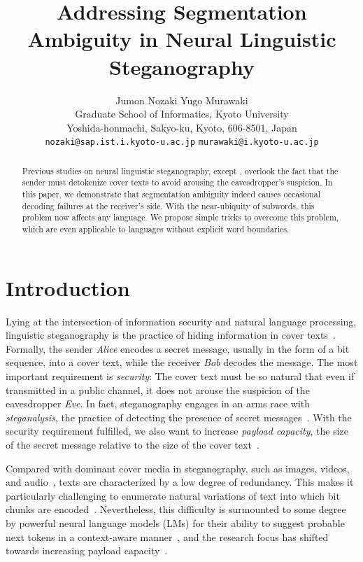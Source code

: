 \documentclass[11pt]{article}
\title{Addressing Segmentation Ambiguity in Neural Linguistic Steganography}
\author{Jumon Nozaki
  \hspace{25mm} Yugo Murawaki \\
    Graduate School of Informatics, Kyoto University \\
    Yoshida-honmachi, Sakyo-ku, Kyoto, 606-8501, Japan \\
  \texttt{nozaki@sap.ist.i.kyoto-u.ac.jp}
  \hspace{10mm}\texttt{murawaki@i.kyoto-u.ac.jp}
}
\begin{document}
\maketitle
\begin{abstract}
Previous studies on neural linguistic steganography, except \citet{ueoka-etal-2021-frustratingly}, overlook the fact that the sender must detokenize cover texts to avoid arousing the eavesdropper's suspicion.
In this paper, we demonstrate that segmentation ambiguity indeed causes occasional decoding failures at the receiver's side.
With the near-ubiquity of subwords, this problem now affects any language.
We propose simple tricks to overcome this problem, which are even applicable to languages without explicit word boundaries.
\end{abstract}


\section{Introduction} \label{sec:introduction}

Lying at the intersection of information security and natural language processing, linguistic steganography is the practice of hiding information in cover texts~\citep{simmons1984prisoners,anderson1998limits,Bennett2004}.
Formally, the sender \textit{Alice} encodes a secret message, usually in the form of a bit sequence, into a cover text, while the receiver \textit{Bob} decodes the message.
The most important requirement is \textit{security}: The cover text must be so natural that even if transmitted in a public channel, it does not arouse the suspicion of the eavesdropper \textit{Eve}.
In fact, steganography engages in an arms race with \textit{steganalysis}, the practice of detecting the presence of secret messages~\citep{fridrich2009steganography}.
With the security requirement fulfilled, we also want to increase \textit{payload capacity}, the size of the secret message relative to the size of the cover text~\citep{chang-clark-2014-practical}.

Compared with dominant cover media in steganography, such as images, videos, and audio~\citep{fridrich2009steganography}, texts are characterized by a low degree of redundancy.
This makes it particularly challenging to enumerate natural variations of text into which bit chunks are encoded~\citep{chang-clark-2014-practical}.
Nevertheless, this difficulty is surmounted to some degree by powerful neural language models (LMs) for their ability to suggest probable next tokens in a context-aware manner~\citep{fang-etal-2017-generating}, and the research focus has shifted towards increasing payload capacity~\citep{dai-cai-2019-towards,ziegler-etal-2019-neural,shen-etal-2020-near,zhang-etal-2021-provably}.
\end{document}
